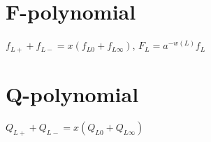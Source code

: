 %


%


\section{F-polynomial}
 $f_{L+} + f_{L-} = x (f_{L0} + f_{L\infty})$,
  $F_L = a^{-w(L)} f_L$ \par

\newpage


\section{Q-polynomial}
$Q_{L+} + Q_{L-} = x (Q_{L0} + Q_{L\infty})$ \par



